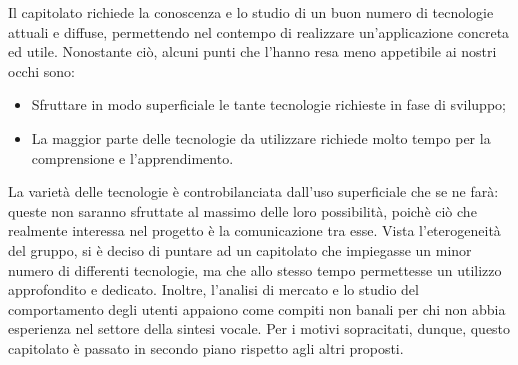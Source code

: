 Il capitolato richiede la conoscenza e lo studio di un buon numero di tecnologie attuali e diffuse, permettendo nel contempo di realizzare un'applicazione concreta ed utile. Nonostante ciò, alcuni punti che l'hanno resa meno appetibile ai nostri occhi sono:
\begin{itemize}
	\item Sfruttare in modo superficiale le tante tecnologie richieste in fase di sviluppo;
	\item La maggior parte delle tecnologie da utilizzare richiede molto tempo per la comprensione e l'apprendimento.
\end{itemize}

La varietà delle tecnologie è controbilanciata dall'uso superficiale che se ne farà: queste non saranno sfruttate al massimo delle loro possibilità, poichè ciò che realmente interessa nel progetto è la comunicazione tra esse. Vista l'eterogeneità del gruppo, si è deciso di puntare ad un capitolato che impiegasse un minor numero di differenti tecnologie, ma che allo stesso tempo permettesse un utilizzo approfondito e dedicato. Inoltre, l'analisi di mercato e lo studio del comportamento
degli utenti appaiono come compiti non banali per chi non abbia esperienza nel settore della sintesi vocale. Per i motivi sopracitati, dunque, questo capitolato è passato in secondo piano rispetto agli altri proposti.